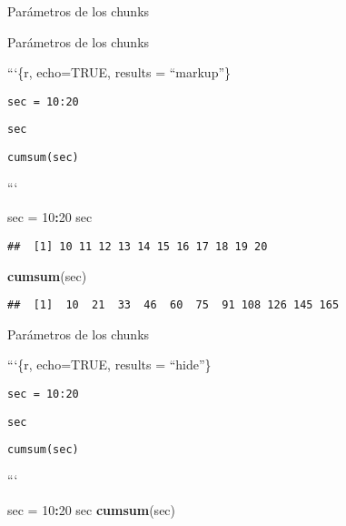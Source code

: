 \documentclass[ignorenonframetext,]{beamer}
\newenvironment{Shaded}{\begin{snugshade}}{\end{snugshade}}
\newcommand{\DecValTok}[1]{\textcolor[rgb]{0.00,0.00,0.81}{#1}}
\newcommand{\KeywordTok}[1]{\textcolor[rgb]{0.13,0.29,0.53}{\textbf{#1}}}
\newcommand{\NormalTok}[1]{#1}
\newcommand{\OperatorTok}[1]{\textcolor[rgb]{0.81,0.36,0.00}{\textbf{#1}}}
\newcommand{\StringTok}[1]{\textcolor[rgb]{0.31,0.60,0.02}{#1}}
\begin{document}
\begin{frame}[fragile]{Parámetros de los chunks}
\end{frame}

\begin{frame}[fragile]{Parámetros de los chunks}
\protect\hypertarget{parametros-de-los-chunks-6}{}

```\{r, echo=TRUE, results = ``markup''\}

\texttt{sec\ =\ 10:20}

\texttt{sec}

\texttt{cumsum(sec)}

```

\n

\begin{Shaded}
\begin{Highlighting}[]
\NormalTok{sec =}\StringTok{ }\DecValTok{10}\OperatorTok{:}\DecValTok{20}
\NormalTok{sec}
\end{Highlighting}
\end{Shaded}

\begin{verbatim}
##  [1] 10 11 12 13 14 15 16 17 18 19 20
\end{verbatim}

\begin{Shaded}
\begin{Highlighting}[]
\KeywordTok{cumsum}\NormalTok{(sec)}
\end{Highlighting}
\end{Shaded}

\begin{verbatim}
##  [1]  10  21  33  46  60  75  91 108 126 145 165
\end{verbatim}

\end{frame}

\begin{frame}[fragile]{Parámetros de los chunks}
\protect\hypertarget{parametros-de-los-chunks-7}{}

```\{r, echo=TRUE, results = ``hide''\}

\texttt{sec\ =\ 10:20}

\texttt{sec}

\texttt{cumsum(sec)}

```

\n

\begin{Shaded}
\begin{Highlighting}[]
\NormalTok{sec =}\StringTok{ }\DecValTok{10}\OperatorTok{:}\DecValTok{20}
\NormalTok{sec}
\KeywordTok{cumsum}\NormalTok{(sec)}
\end{Highlighting}
\end{Shaded}

\end{frame}
\end{document}
